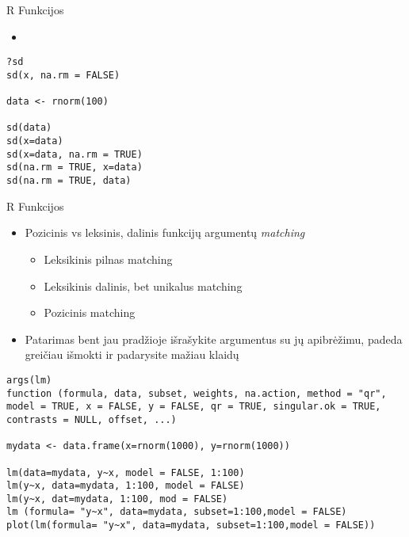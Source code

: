 \documentclass[11pt,xcolor=table]{beamer}
\begin{document}

\begin{frame}[fragile]{R Funkcijos}
\begin{itemize}
\item 

\end{itemize}
\begin{lstlisting}
?sd
sd(x, na.rm = FALSE)

data <- rnorm(100)

sd(data)
sd(x=data)
sd(x=data, na.rm = TRUE)
sd(na.rm = TRUE, x=data)
sd(na.rm = TRUE, data)
\end{lstlisting}
\end{frame}



\begin{frame}[fragile]{R Funkcijos}
\begin{itemize}
\item Pozicinis vs leksinis, dalinis funkcijų argumentų  \textit{matching}
\begin{itemize}
\item Leksikinis pilnas matching
\item Leksikinis dalinis, bet unikalus matching
\item Pozicinis matching
\end{itemize}
\item Patarimas bent jau pradžioje išrašykite argumentus su jų apibrėžimu, padeda greičiau išmokti ir padarysite mažiau klaidų
\end{itemize}
\begin{lstlisting}
args(lm)
function (formula, data, subset, weights, na.action, method = "qr", model = TRUE, x = FALSE, y = FALSE, qr = TRUE, singular.ok = TRUE, contrasts = NULL, offset, ...) 

mydata <- data.frame(x=rnorm(1000), y=rnorm(1000))

lm(data=mydata, y~x, model = FALSE, 1:100)
lm(y~x, data=mydata, 1:100, model = FALSE)
lm(y~x, dat=mydata, 1:100, mod = FALSE)
lm (formula= "y~x", data=mydata, subset=1:100,model = FALSE)
plot(lm(formula= "y~x", data=mydata, subset=1:100,model = FALSE))
 
\end{lstlisting}
\end{frame}

\end{document}
